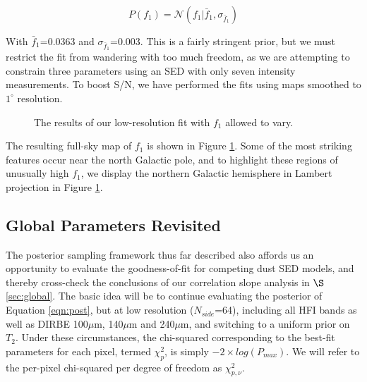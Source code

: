 \documentclass{emulateapj}
\begin{document}
\begin{equation} \label{equ:f1prior}
P(f_1) = \mathcal{N}(f_1|\bar{f}_1, \sigma_{\bar{f}_1})
\end{equation}

With $\bar{f}_1$=0.0363 and $\sigma_{\bar{f}_1}$=0.003. This is a fairly
stringent prior, but we must restrict the fit from wandering with too much
freedom, as we are attempting to constrain three parameters using an SED
with only seven intensity measurements. To boost S/N, we have performed
the fits using maps smoothed to $1^{\circ}$ resolution.

\begin{figure}
\begin{center}
\caption{\label{fig:f1} The results of our low-resolution fit with $f_1$
allowed to vary.}
\end{center}
\end{figure}


The resulting full-sky map of $f_1$ is shown in Figure \ref{fig:f1}. Some of 
the most striking features occur near the north Galactic pole, and to 
highlight these regions of unusually high $f_1$, we display the northern
Galactic hemisphere in Lambert projection in Figure \ref{fig:f1}.
 

\subsection{Global Parameters Revisited}
\label{sec:hier}

The posterior sampling framework thus far described also affords us an
opportunity to evaluate the goodness-of-fit for competing dust SED models, and 
thereby cross-check the conclusions of our correlation slope analysis in
$\S$\ref{sec:global}. The basic idea will be to continue evaluating the 
posterior of Equation \ref{eqn:post}, but at low resolution ($N_{side}$=64), 
including all HFI bands as well as DIRBE 100$\mu$m, 140$\mu$m and 240$\mu$m, 
and switching to a uniform prior on $T_2$. Under these circumstances, the 
chi-squared corresponding to the best-fit parameters for each pixel, termed 
$\chi^2_p$, is simply $-2 \times log(P_{max})$. We will refer to the
per-pixel chi-squared per degree of freedom as $\chi^2_{p, \nu}$.
\end{document}
